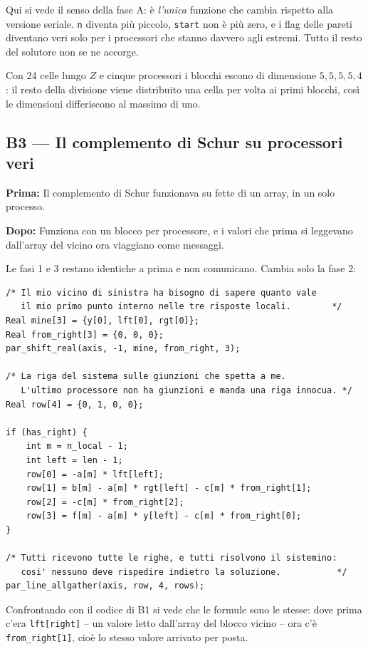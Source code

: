 \documentclass[11pt,a4paper]{article}
\newcommand{\prima}[1]{\par\smallskip\noindent\textbf{\color{scuro}Prima:} #1\par}
\newcommand{\dopo}[1]{\par\smallskip\noindent\textbf{\color{scuro}Dopo:} #1\par\smallskip}
\newcommand{\cd}[1]{\texttt{\small #1}}
\newenvironment{blocco}{\par\noindent\begin{minipage}{\linewidth}}{\end{minipage}\par}
\begin{document}
Qui si vede il senso della fase A: è \emph{l'unica} funzione che cambia rispetto
alla versione seriale. \cd{n} diventa più piccolo, \cd{start} non è più zero, e
i flag delle pareti diventano veri solo per i processori che stanno davvero agli
estremi. Tutto il resto del solutore non se ne accorge.

Con 24 celle lungo $Z$ e cinque processori i blocchi escono di dimensione
$5,5,5,5,4$: il resto della divisione viene distribuito una cella per volta ai
primi blocchi, così le dimensioni differiscono al massimo di uno.

\subsection*{B3 --- Il complemento di Schur su processori veri}

\prima{Il complemento di Schur funzionava su fette di un array, in un solo
processo.}
\dopo{Funziona con un blocco per processore, e i valori che prima si leggevano
dall'array del vicino ora viaggiano come messaggi.}

Le fasi 1 e 3 restano identiche a prima e non comunicano. Cambia solo la fase 2:

\begin{blocco}
\begin{lstlisting}
/* Il mio vicino di sinistra ha bisogno di sapere quanto vale
   il mio primo punto interno nelle tre risposte locali.        */
Real mine[3] = {y[0], lft[0], rgt[0]};
Real from_right[3] = {0, 0, 0};
par_shift_real(axis, -1, mine, from_right, 3);

/* La riga del sistema sulle giunzioni che spetta a me.
   L'ultimo processore non ha giunzioni e manda una riga innocua. */
Real row[4] = {0, 1, 0, 0};

if (has_right) {
    int m = n_local - 1;
    int left = len - 1;
    row[0] = -a[m] * lft[left];
    row[1] = b[m] - a[m] * rgt[left] - c[m] * from_right[1];
    row[2] = -c[m] * from_right[2];
    row[3] = f[m] - a[m] * y[left] - c[m] * from_right[0];
}

/* Tutti ricevono tutte le righe, e tutti risolvono il sistemino:
   cosi' nessuno deve rispedire indietro la soluzione.           */
par_line_allgather(axis, row, 4, rows);
\end{lstlisting}
\end{blocco}

Confrontando con il codice di B1 si vede che le formule sono le stesse: dove
prima c'era \cd{lft[right]} -- un valore letto dall'array del blocco vicino --
ora c'è \cd{from\_right[1]}, cioè lo stesso valore arrivato per posta.
\end{document}
